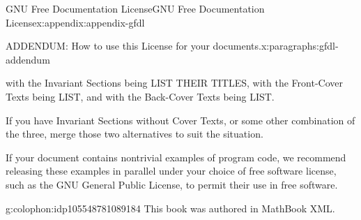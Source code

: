 \documentclass[oneside,10pt,]{book}
\newcommand{\xreffont}{\relax}
\numberwithin{equation}{part}
\providecommand\phantomsection{}
\begin{document}
\begin{appendixptx}{GNU Free Documentation License}{}{GNU Free Documentation License}{}{}{x:appendix:appendix-gfdl}
\begin{paragraphs}{ADDENDUM: How to use this License for your documents.}{x:paragraphs:gfdl-addendum}
\begin{preformatted}
with the Invariant Sections being LIST THEIR TITLES, with the
Front-Cover Texts being LIST, and with the Back-Cover Texts being LIST.
\end{preformatted}
If you have Invariant Sections without Cover Texts, or some other combination of the three, merge those two alternatives to suit the situation.%
\par
If your document contains nontrivial examples of program code, we recommend releasing these examples in parallel under your choice of free software license, such as the GNU General Public License, to permit their use in free software.%
\end{paragraphs}%
\end{appendixptx}
%
\backmatter%
%
\clearpage\phantomsection%
%
%
{\xreffont\printindex}
%
\clearpage
\pagestyle{empty}
\begin{backcolophon}{g:colophon:idp105548781089184}%
This book was authored in MathBook XML.%
\end{backcolophon}%
\end{document}

